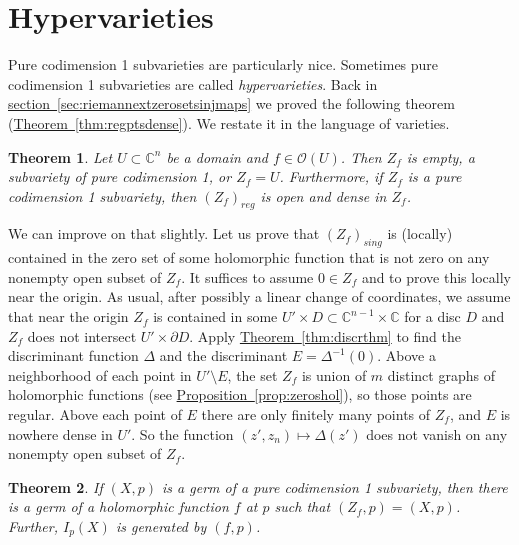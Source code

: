 \documentclass[12pt,openany]{book}
\newcommand{\C}{{\mathbb{C}}}
\newcommand{\sO}{{\mathscr{O}}}
\theoremstyle{plain}
\newtheorem{thm}{Theorem}[section]
\theoremstyle{remark}
\theoremstyle{definition}
\theoremstyle{exercise}
\theoremstyle{example}
\newcommand{\sectionref}[1]{\hyperref[#1]{section~\ref*{#1}}}
\newcommand{\thmref}[1]{\hyperref[#1]{Theorem~\ref*{#1}}}
\newcommand{\propref}[1]{\hyperref[#1]{Proposition~\ref*{#1}}}
\begin{document}

\section{Hypervarieties} \label{section:hypervarieties}


Pure codimension 1 subvarieties are particularly nice.
Sometimes pure codimension 1 subvarieties are called
\emph{hypervarieties}.
Back in \sectionref{sec:riemannextzerosetsinjmaps} we proved
the following theorem (\thmref{thm:regptsdense}).  We restate it in the
language of varieties.

\begin{thm} \label{thm:regptsdense2}
Let $U \subset \C^n$ be a domain and
$f \in \sO(U)$.  Then $Z_f$ is empty, a subvariety of pure codimension 1, or
$Z_f = U$.
Furthermore, if $Z_f$ is a pure codimension 1 subvariety, then
$(Z_f)_{\mathit{reg}}$ is open and dense in $Z_f$.
\end{thm}

We can improve on that slightly.
Let us prove that $(Z_f)_{\mathit{sing}}$ is (locally) contained in the zero set of some holomorphic
function that is not zero on any nonempty open subset of $Z_f$.
It suffices to assume $0 \in Z_f$ and to prove this locally near the origin.
As usual, after possibly a linear change of coordinates, we assume
that near the origin $Z_f$ is contained in some $U' \times D \subset
\C^{n-1} \times \C$ for a disc $D$ and $Z_f$ does not
intersect $U' \times \partial D$.
Apply \thmref{thm:discrthm} to find
the discriminant function
$\Delta$ and the discriminant $E = \Delta^{-1}(0)$.
Above a neighborhood of each
point in $U' \setminus E$, the set $Z_f$ is union of $m$ distinct graphs
of holomorphic functions (see \propref{prop:zeroshol}), so those
points are regular.  Above
each point of $E$ there are only finitely many points of $Z_f$,
and $E$ is nowhere dense in $U'$.  So the
function $(z',z_n) \mapsto \Delta(z')$ does not vanish on any nonempty open
subset of $Z_f$.

\begin{thm} \label{thm:codim1var}
If $(X,p)$ is a germ of a pure codimension 1 subvariety, then
there is a germ of a holomorphic function $f$ at $p$
such that $(Z_f,p) = (X,p)$.  Further, $I_p(X)$ is generated by $(f,p)$.
\end{thm}
\end{document}
